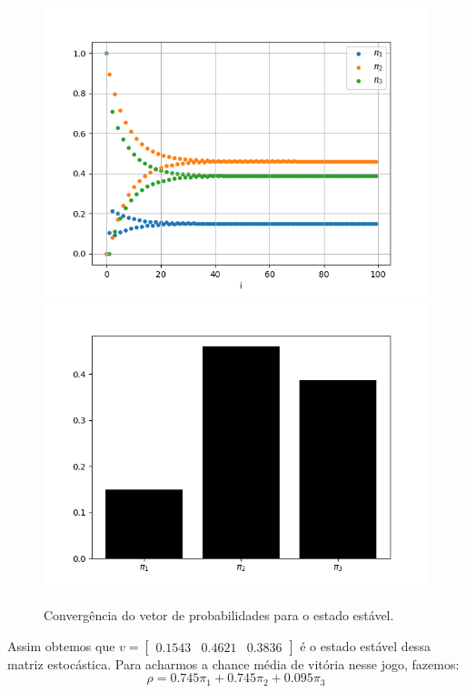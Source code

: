 \documentclass[12pt]{article}
\begin{document}
\begin{figure}[H]
\centering
\includegraphics[scale=0.55]{graph6.png}
\includegraphics[scale=0.55]{graph7.png}
\caption{Convergência do vetor de probabilidades para o estado estável.}
\end{figure}

Assim obtemos que $v = \begin{bmatrix} 0.1543 & 0.4621 & 0.3836 \end{bmatrix}$ é o estado estável dessa matriz estocástica. Para acharmos a chance média de vitória nesse jogo, fazemos:\\

$$
\rho = 0.745\pi_1 + 0.745\pi_2 + 0.095\pi_3 
$$
\end{document}
